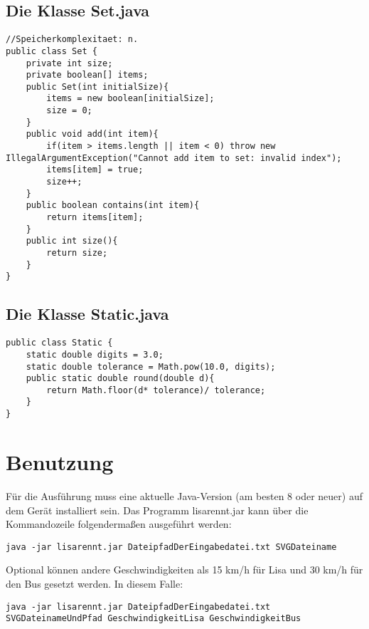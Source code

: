 \documentclass[a4paper,10pt,ngerman]{scrartcl}
\begin{document}
\subsection{Die Klasse Set.java}
\begin{lstlisting}[frame=single]
//Speicherkomplexitaet: n.
public class Set {
    private int size;
    private boolean[] items;
    public Set(int initialSize){
        items = new boolean[initialSize];
        size = 0;
    }
    public void add(int item){
        if(item > items.length || item < 0) throw new IllegalArgumentException("Cannot add item to set: invalid index");
        items[item] = true;
        size++;
    }
    public boolean contains(int item){
        return items[item];
    }
    public int size(){
        return size;
    }
}
\end{lstlisting}
\subsection{Die Klasse Static.java}
\begin{lstlisting}[frame=single]
public class Static {
    static double digits = 3.0;
    static double tolerance = Math.pow(10.0, digits);
    public static double round(double d){
        return Math.floor(d* tolerance)/ tolerance;
    }
}
\end{lstlisting}
\section{Benutzung}
Für die Ausführung muss eine aktuelle Java-Version (am besten 8 oder neuer) auf dem Gerät installiert sein.\linebreak
Das Programm lisarennt.jar kann über die Kommandozeile folgendermaßen ausgeführt werden:
\lstset{language=none}
\begin{lstlisting}
java -jar lisarennt.jar DateipfadDerEingabedatei.txt SVGDateiname
\end{lstlisting}
Optional können andere Geschwindigkeiten als 15 km/h für Lisa und 30 km/h für den Bus gesetzt werden. In diesem Falle:
\begin{lstlisting}
java -jar lisarennt.jar DateipfadDerEingabedatei.txt SVGDateinameUndPfad GeschwindigkeitLisa GeschwindigkeitBus
\end{lstlisting}
\end{document}

